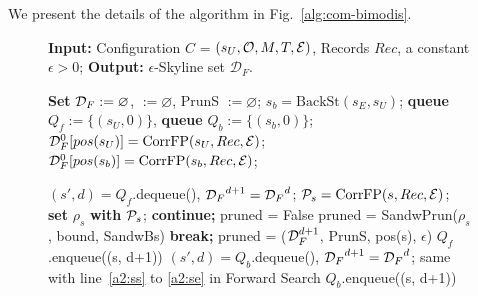 We present the details of the 
algorithm \bimodis in Fig.~\ref{alg:com-bimodis}. 

\begin{figure}
\centering
\begin{algorithm}[H]
\caption{\bimodis
}
\label{alg:bimodis:complete}
\begin{algorithmic}[1]

\State \textbf{Input:} 
    Configuration $C$ = $(s_U, \O, M, T, \E)$, 
    Records $Rec$,
    a constant $\epsilon>0$;
\State \textbf{Output:} 
     $\epsilon$-Skyline set $\mathcal{D}_F$.
     \vspace{1ex}

\State \textbf{Set} $\D_F := \varnothing$, 
    \swb $:= \varnothing$,
    PrunS $:= \varnothing$;
    $s_b = \text{BackSt}(s_E, s_U)$; \label{a2:inis}
\State \textbf{queue} $Q_f := \{(s_U, 0)\}$,  
    \textbf{queue} $Q_b := \{(s_b, 0)\}$;
\State $\D_F^0[pos(s_U)] = \text{CorrFP}(s_U, Rec, \E)$;
\State $\D_F^0[pos(s_b)] = \text{CorrFP}(s_b, Rec, \E)$; \label{a2:inie}

\State $(s', d)= Q_f$.dequeue(), ${\D_F}^{d+1} = {\D_F}^d$;  \label{a2:fss}
    \State $\P_s = \text{CorrFP}(s, Rec, \E)$; \textbf{set} $\rho_s$  \textbf{with} $\P_s$; \label{a2:ss}
     \textbf{continue;} \EndIf \label{a2:pos_prune}
        \State pruned = False
        \State pruned = SandwPrun($\rho_s$, bound, SandwBs)
     \textbf{break;} \EndIf
    \EndFor
    \State pruned = \upi($\D_F^{d+1}$, PrunS, pos(s), $\epsilon$) \label{a2:se}
     $Q_f$.enqueue((s, d+1)) \EndIf \label{a2:enqueue}
\EndFor \label{a2:fse}
\State $(s', d)= Q_b$.dequeue(), ${\D_F}^{d+1} = {\D_F}^d$;  \label{a2:bss}
\State same with line~\ref{a2:ss} to \ref{a2:se} in Forward Search
     $Q_b$.enqueue((s, d+1)) \EndIf
\EndFor \label{a2:bse}
\EndWhile


\end{algorithmic}
\end{algorithm}
\end{figure}
